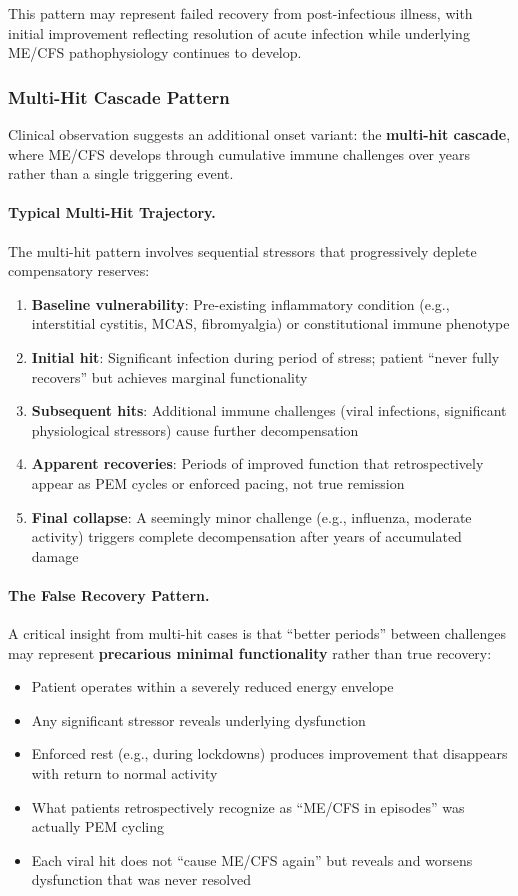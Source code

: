 This pattern may represent failed recovery from post-infectious illness, with initial improvement reflecting resolution of acute infection while underlying ME/CFS pathophysiology continues to develop.

\subsubsection{Multi-Hit Cascade Pattern}
\label{sec:multi-hit-cascade}

Clinical observation suggests an additional onset variant: the \textbf{multi-hit cascade}, where ME/CFS develops through cumulative immune challenges over years rather than a single triggering event.

\paragraph{Typical Multi-Hit Trajectory.}
The multi-hit pattern involves sequential stressors that progressively deplete compensatory reserves:
\begin{enumerate}
    \item \textbf{Baseline vulnerability}: Pre-existing inflammatory condition (e.g., interstitial cystitis, MCAS, fibromyalgia) or constitutional immune phenotype
    \item \textbf{Initial hit}: Significant infection during period of stress; patient ``never fully recovers'' but achieves marginal functionality
    \item \textbf{Subsequent hits}: Additional immune challenges (viral infections, significant physiological stressors) cause further decompensation
    \item \textbf{Apparent recoveries}: Periods of improved function that retrospectively appear as PEM cycles or enforced pacing, not true remission
    \item \textbf{Final collapse}: A seemingly minor challenge (e.g., influenza, moderate activity) triggers complete decompensation after years of accumulated damage
\end{enumerate}

\paragraph{The False Recovery Pattern.}
A critical insight from multi-hit cases is that ``better periods'' between challenges may represent \textbf{precarious minimal functionality} rather than true recovery:
\begin{itemize}
    \item Patient operates within a severely reduced energy envelope
    \item Any significant stressor reveals underlying dysfunction
    \item Enforced rest (e.g., during lockdowns) produces improvement that disappears with return to normal activity
    \item What patients retrospectively recognize as ``ME/CFS in episodes'' was actually PEM cycling
    \item Each viral hit does not ``cause ME/CFS again'' but reveals and worsens dysfunction that was never resolved
\end{itemize}

